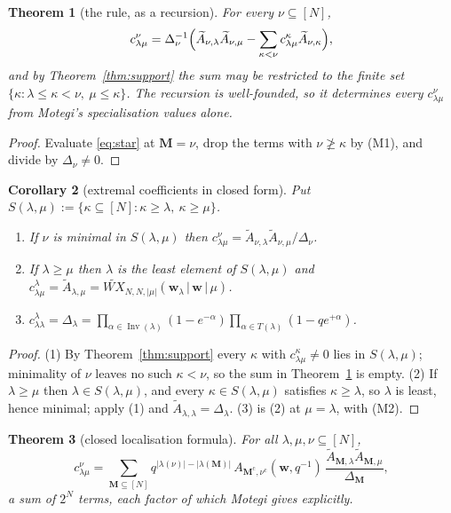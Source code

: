 \documentclass[11pt]{article}
\theoremstyle{plain}
\newtheorem{thm}{Theorem}
\newtheorem{cor}[thm]{Corollary}
\theoremstyle{definition}
\theoremstyle{remark}
\newcommand{\Inv}{\operatorname{Inv}}
\newcommand{\bM}{\mathbf{M}}
\newcommand{\bw}{\mathbf{w}}
\newcommand{\WXt}{\widetilde{W\!X}}
\begin{document}
\begin{thm}[the rule, as a recursion]\label{thm:rec}
For every $\nu\subseteq[N]$,
\[
c^{\nu}_{\lambda\mu}
=\Delta_{\nu}^{-1}\Bigl(
\widetilde A_{\nu,\lambda}\widetilde A_{\nu,\mu}
-\sum_{\kappa<\nu}c^{\kappa}_{\lambda\mu}\widetilde A_{\nu,\kappa}
\Bigr),
\]
and by Theorem~\ref{thm:support} the sum may be restricted to the finite set
$\{\kappa:\lambda\le\kappa<\nu,\ \mu\le\kappa\}$.  The recursion is
well-founded, so it determines every $c^{\nu}_{\lambda\mu}$ from Motegi's
specialisation values alone.
\end{thm}

\begin{proof}
Evaluate \eqref{eq:star} at $\bM=\nu$, drop the terms with $\nu\not\ge\kappa$ by
(M1), and divide by $\Delta_{\nu}\ne0$.
\end{proof}

\begin{cor}[extremal coefficients in closed form]\label{cor:extremal}
Put $S(\lambda,\mu):=\{\kappa\subseteq[N]:\kappa\ge\lambda,\ \kappa\ge\mu\}$.
\begin{enumerate}
\item If $\nu$ is minimal in $S(\lambda,\mu)$ then
$c^{\nu}_{\lambda\mu}
=\widetilde A_{\nu,\lambda}\widetilde A_{\nu,\mu}/\Delta_{\nu}$.
\item If $\lambda\ge\mu$ then $\lambda$ is the least element of
$S(\lambda,\mu)$ and
$c^{\lambda}_{\lambda\mu}=\widetilde A_{\lambda,\mu}
=\WXt_{N,N,|\mu|}(\bw_{\lambda}\,|\,\bw\,|\,\mu)$.
\item $c^{\lambda}_{\lambda\lambda}=\Delta_{\lambda}
=\prod_{\alpha\in\Inv(\lambda)}(1-e^{-\alpha})
 \prod_{\alpha\in T(\lambda)}(1-qe^{+\alpha})$.
\end{enumerate}
\end{cor}

\begin{proof}
(1)  By Theorem~\ref{thm:support} every $\kappa$ with
$c^{\kappa}_{\lambda\mu}\ne0$ lies in $S(\lambda,\mu)$; minimality of $\nu$
leaves no such $\kappa<\nu$, so the sum in Theorem~\ref{thm:rec} is empty.
(2)  If $\lambda\ge\mu$ then $\lambda\in S(\lambda,\mu)$, and every
$\kappa\in S(\lambda,\mu)$ satisfies $\kappa\ge\lambda$, so $\lambda$ is least,
hence minimal; apply (1) and $\widetilde A_{\lambda,\lambda}=\Delta_{\lambda}$.
(3)  is (2) at $\mu=\lambda$, with (M2).
\end{proof}

\begin{thm}[closed localisation formula]\label{thm:loc}
For all $\lambda,\mu,\nu\subseteq[N]$,
\[
c^{\nu}_{\lambda\mu}
=\sum_{\bM\subseteq[N]}
q^{|\lambda(\nu)|-|\lambda(\bM)|}\,
A_{\bM^{\mathrm c},\nu^{\mathrm c}}(\bw,q^{-1})\,
\frac{\widetilde A_{\bM,\lambda}\widetilde A_{\bM,\mu}}{\Delta_{\bM}},
\]
a sum of $2^N$ terms, each factor of which Motegi gives explicitly.
\end{thm}
\end{document}
